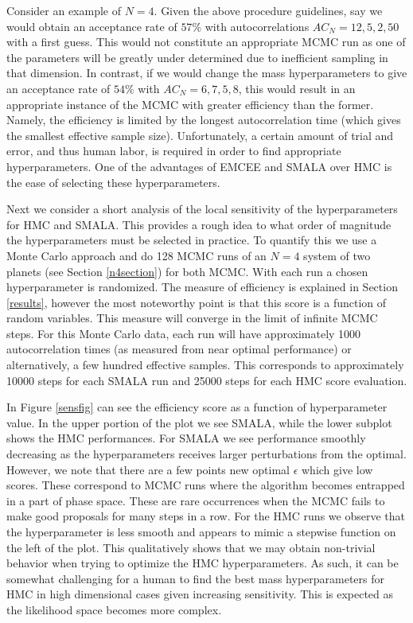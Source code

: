 \documentclass{aa}
\begin{document}
Consider an example of $N=4$. Given the above procedure guidelines, say we would obtain an acceptance rate of $57\%$ with autocorrelations $AC_N = 12, 5, 2, 50$ with a first guess. This would not constitute an appropriate MCMC run as one of the parameters will be greatly under determined due to inefficient sampling in that dimension. In contrast, if we would change the mass hyperparameters to give an acceptance rate of $54\%$ with $AC_N = 6, 7, 5, 8$, this would result in an appropriate instance of the MCMC with greater efficiency than the former. Namely, the efficiency is limited by the longest autocorrelation time (which gives the smallest effective sample size). Unfortunately, a certain amount of trial and error, and thus human labor, is required in order to find appropriate hyperparameters. One of the advantages of EMCEE and SMALA over HMC is the ease of selecting these hyperparameters.

Next we consider a short analysis of the local sensitivity of the hyperparameters for HMC and SMALA. This provides a rough idea to what order of magnitude the hyperparameters must be selected in practice. To quantify this we use a Monte Carlo approach and do 128 MCMC runs of an $N=4$ system of two planets (see Section \ref{n4section}) for both MCMC. With each run a chosen hyperparameter is randomized. The measure of efficiency is explained in Section \ref{results}, however the most noteworthy point is that this score is a function of random variables. This measure will converge in the limit of infinite MCMC steps. For this Monte Carlo data, each run will have approximately 1000 autocorrelation times (as measured from near optimal performance) or alternatively, a few hundred effective samples. This corresponds to approximately 10000 steps for each SMALA run and 25000 steps for each HMC score evaluation. 

In Figure \ref{sensfig} can see the efficiency score as a function of hyperparameter value. In the upper portion of the plot we see SMALA, while the lower subplot shows the HMC performances. For SMALA we see performance smoothly decreasing as the hyperparameters receives larger perturbations from the optimal. However, we note that there are a few points new optimal $\epsilon$ which give low scores. These correspond to MCMC runs where the algorithm becomes entrapped in a part of phase space. These are rare occurrences when the MCMC fails to make good proposals for many steps in a row. For the HMC runs we observe that the hyperparameter is less smooth and appears to mimic a stepwise function on the left of the plot. This qualitatively shows that we may obtain non-trivial behavior when trying to optimize the HMC hyperparameters. As such, it can be somewhat challenging for a human to find the best mass hyperparameters for HMC in high dimensional cases given increasing sensitivity. This is expected as the likelihood space becomes more complex.
\end{document}
